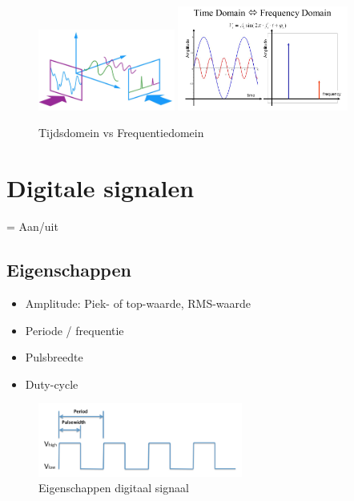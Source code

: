 \documentclass{article}
\begin{document}
\begin{figure}[H]
    \centering
    \centerline{
        \includegraphics[width=0.4\textwidth]{Screenshot_20200217_122108.png}
        \includegraphics[width=0.5\textwidth]{Screenshot_20200217_122246.png}    
    }
    \caption{Tijdsdomein vs Frequentiedomein}
\end{figure}

\section{Digitale signalen}
= Aan/uit

\subsection{Eigenschappen}
\begin{itemize}
    \item Amplitude: Piek- of top-waarde, RMS-waarde
    \item Periode / frequentie
    \item Pulsbreedte 
    \item Duty-cycle
\end{itemize}


\begin{figure}[H]
    \centering
    \includegraphics[width=0.6\textwidth]{Screenshot_20200315_120112.png}
    \caption{Eigenschappen digitaal signaal}
\end{figure}
\end{document}

